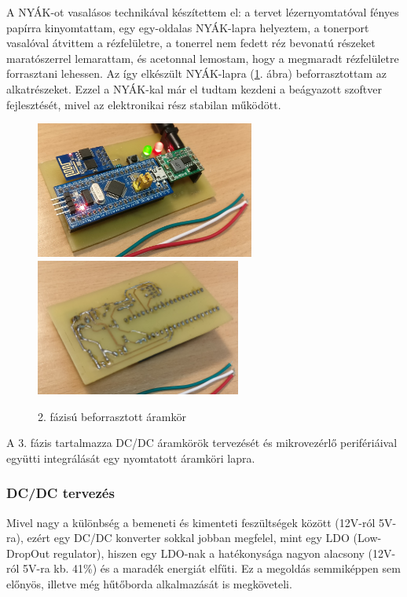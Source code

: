 \documentclass[../main.tex]{subfiles}
\begin{document}
        A NYÁK-ot vasalásos technikával készítettem el: a tervet lézernyomtatóval fényes papírra kinyomtattam, egy egy-oldalas NYÁK-lapra helyeztem, a tonerport vasalóval átvittem a rézfelületre, a tonerrel nem fedett réz bevonatú részeket maratószerrel lemarattam, és acetonnal lemostam, hogy a megmaradt rézfelületre forrasztani lehessen. Az így elkészült NYÁK-lapra (\ref{fig:pcb_v01}. ábra) beforrasztottam az alkatrészeket. Ezzel a NYÁK-kal már el tudtam kezdeni a beágyazott szoftver fejlesztését, mivel az elektronikai rész stabilan működött.
        
        \begin{figure}[h!]
            \centering
                \includegraphics[height=4.5cm]{resources/pcb_res/pcb_v01}
                \includegraphics[height=4.5cm]{resources/pcb_res/pcb_v02}
            \caption{2. fázisú beforrasztott áramkör}
            \label{fig:pcb_v01}
        \end{figure}
        
        A 3. fázis tartalmazza DC/DC áramkörök tervezését és mikrovezérlő perifériáival együtti integrálását egy nyomtatott áramköri lapra.
        
        \subsubsection{DC/DC tervezés}
            Mivel nagy a különbség a bemeneti és kimenteti feszültségek között (12V-ról 5V-ra), ezért egy DC/DC konverter sokkal jobban megfelel, mint egy LDO (Low-DropOut regulator), hiszen egy LDO-nak a hatékonysága nagyon alacsony (12V-ról 5V-ra kb. 41\%) és a maradék energiát elfűti. Ez a megoldás semmiképpen sem előnyös, illetve még hűtőborda alkalmazását is megköveteli.
            
\end{document}
